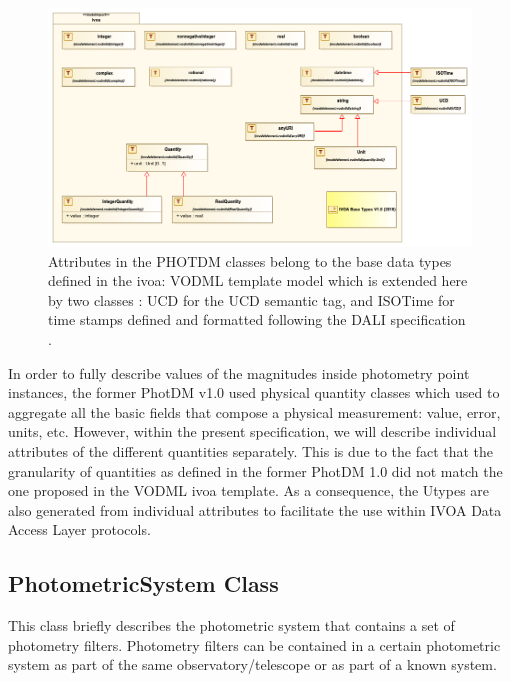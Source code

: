 \documentclass[11pt,a4paper]{ivoa}
\begin{document}
\begin{figure}[H]
\includegraphics[angle=0,width=5.98in ]{./schema/BaseDataTypesDiagram_PR_20220520.png} 
\caption{Attributes in the PHOTDM classes belong to the base data types defined in the ivoa: VODML template model which is extended here by two classes : UCD for the UCD semantic tag, and ISOTime for time stamps defined and formatted following the DALI specification \citep{2017ivoa.spec.0517D} .} 
\end{figure}





\newpage


\newpage

In order to fully describe values of the magnitudes inside photometry point 
instances, the former PhotDM v1.0 used  physical quantity classes which used to 
aggregate all the basic fields that compose a physical measurement: value, 
error, units, etc. However, within the present specification, we will describe 
individual attributes of the different quantities separately. 
This is due to the fact that the granularity of quantities as defined in the former PhotDM 1.0 did not match the one proposed in the 
VODML ivoa template.  As a consequence,
the Utypes are also generated from individual attributes to facilitate the use within IVOA Data Access Layer protocols.
\par

\subsection{PhotometricSystem Class}
This class briefly describes the photometric system that contains a set of 
photometry filters. Photometry filters can be contained in a certain 
photometric system as part of the same observatory/telescope or as part 
of a known system.
\par
\end{document}
